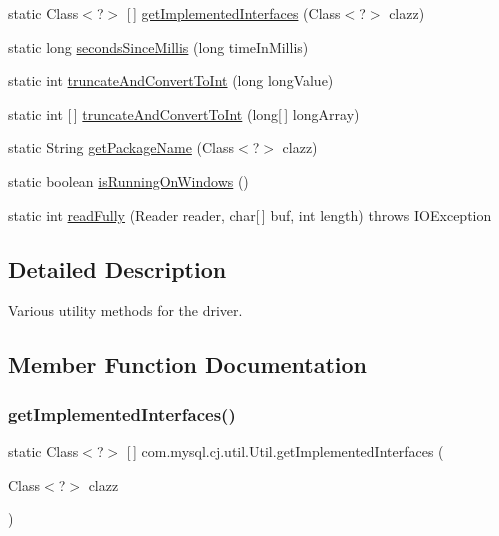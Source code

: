 \begin{DoxyCompactItemize}
static Class$<$?$>$ \mbox{[}$\,$\mbox{]} \mbox{\hyperlink{classcom_1_1mysql_1_1cj_1_1util_1_1_util_acdf8981f8f07769f27e5f3b435fd538f}{get\+Implemented\+Interfaces}} (Class$<$?$>$ clazz)
\item 
static long \mbox{\hyperlink{classcom_1_1mysql_1_1cj_1_1util_1_1_util_a08372a744b3f8a35407af8dd8d0d44e4}{seconds\+Since\+Millis}} (long time\+In\+Millis)
\item 
static int \mbox{\hyperlink{classcom_1_1mysql_1_1cj_1_1util_1_1_util_a2f847b31da7b0217bf7c9dbbba3324db}{truncate\+And\+Convert\+To\+Int}} (long long\+Value)
\item 
static int \mbox{[}$\,$\mbox{]} \mbox{\hyperlink{classcom_1_1mysql_1_1cj_1_1util_1_1_util_a73b0a7029da0c63b85399eeee5d36527}{truncate\+And\+Convert\+To\+Int}} (long\mbox{[}$\,$\mbox{]} long\+Array)
\item 
static String \mbox{\hyperlink{classcom_1_1mysql_1_1cj_1_1util_1_1_util_a142027940787b4d09dc21ea4c5de617e}{get\+Package\+Name}} (Class$<$?$>$ clazz)
\item 
static boolean \mbox{\hyperlink{classcom_1_1mysql_1_1cj_1_1util_1_1_util_a4e59730a5516d2c70614031e108c51bb}{is\+Running\+On\+Windows}} ()
\item 
static int \mbox{\hyperlink{classcom_1_1mysql_1_1cj_1_1util_1_1_util_afdf93512d8a6651e10b26d2f6f5613b2}{read\+Fully}} (Reader reader, char\mbox{[}$\,$\mbox{]} buf, int length)  throws I\+O\+Exception 
\end{DoxyCompactItemize}


\subsection{Detailed Description}
Various utility methods for the driver. 

\subsection{Member Function Documentation}
\mbox{\label{classcom_1_1mysql_1_1cj_1_1util_1_1_util_acdf8981f8f07769f27e5f3b435fd538f}} 
\subsubsection{\texorpdfstring{get\+Implemented\+Interfaces()}{getImplementedInterfaces()}}
{\footnotesize\ttfamily static Class$<$?$>$ \mbox{[}$\,$\mbox{]} com.\+mysql.\+cj.\+util.\+Util.\+get\+Implemented\+Interfaces (\begin{DoxyParamCaption}\item[{Class$<$?$>$}]{clazz }\end{DoxyParamCaption})\hspace{0.3cm}{\ttfamily [static]}}

